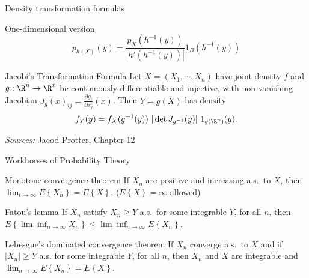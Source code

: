\begin{frame}
    {Density transformation formulas}
    
    \begin{block}{One-dimensional version}
        \begin{equation*}
            p_{h(X)} (y) = \frac{p_X (h^{-1}(y))}{| h'(h^{-1}(y)) |} 1_B(h^{-1}(y))
        \end{equation*}
        
    \end{block}

    \begin{block}{Jacobi's Transformation Formula}
        Let $X=(X_1, \cdots,X_n)$ have joint density $f$ and $g:\R^n \to \R^n$ be
        continuously differentiable and injective, with non-vanishing Jacobian
        $J_g(x)_{ij}= \frac{\partial g_i}{\partial x_j} (x)$.
        Then $Y=g(X)$ has density 
        \begin{equation*}
        f_Y(y) = f_X(g^{-1}(y)) \ |\det J_{g^{-1}}(y) | \ 1_{g(\R^n)}(y).
        \end{equation*}
    \end{block}

    \emph{Sources: } Jacod-Protter, Chapter 12
\end{frame}




\begin{frame}
    {Workhorses of Probability Theory}
    
    \begin{block}{Monotone convergence theorem}
        If $X_n$ are positive and increasing a.s.\ to $X$, then 
        $\lim_{t\to \infty} E \left\{ X_n \right\} = E \left\{ X \right\}$.
        ($E\left\{ X \right\} =\infty$ allowed)
    \end{block}

    \begin{block}{Fatou's lemma}
        If $X_n$ satisfy $X_n \geq Y$ a.s.\ for some integrable $Y$, for all $n$,
        then 
        $E\left\{ \lim\inf_{n\to \infty} X_n \right\} 
                \leq \lim\inf_{n\to \infty} E\left\{ X_n \right\}$.
    \end{block}
    
    \begin{block}{Lebesgue's dominated convergence theorem}
        If $X_n$ converge a.s.\ to $X$ and if $ |X_n| \geq Y$ a.s. for some integrable $Y$,
        for all $n$, then $X_n$ and $X$ are integrable and 
        $\lim_{n\to \infty} E\left\{ X_n \right\} = E\left\{ X \right\}$.
    \end{block}
\end{frame}







